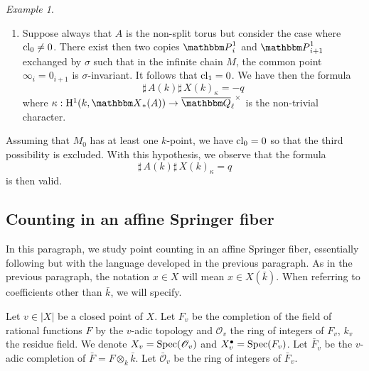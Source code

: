 \documentclass[12pt,english]{smfart}
\numberwithin{equation}{subsection}
\theoremstyle{remark}
\newtheorem{exemple}[equation]{Example}
\newcommand\calO{{\mathscr O}}
\newcommand\QQ{{\mathbbm Q}}
\newcommand\bbP{{\mathbbm P}}
\newcommand\rmH{{\rm H}}
\newcommand\bbX{{\mathbbm X}}
\newcommand\Spec{{\rm Spec}}
\newcommand\cl{{\rm cl}}
\newcommand\Ql{{\overline\QQ_\ell}}
\begin{document}
\begin{exemple}
\begin{enumerate}
   Suppose now that $\cl_0=0$. Then, there exists exactly
   one copy $\bbP^1_i$ in the infinite chain stable under $\sigma$.
   Since $A$ is the non-split torus, $\sigma$ necessarily exchanges
   $0_i$ and $\infty_i$. It follows that $\cl_1\not=0$.

   If $\kappa:\rmH^1(k,\bbX_*(A))\rightarrow \Ql^\times$ is the
   non-trivial character, we then have the formula
   $${\sharp\,} X(k)_\kappa=1-\frac{1}{q+1}=\frac{q}{q+1}
   $$
   which is more agreeable to remember in the form
   $${\sharp\,} A(k) {\sharp\,} X(k)_\kappa=q.$$

 \item Suppose always that $A$ is the non-split torus but
   consider the case where $\cl_0\not =0$. There exist then two copies
   $\bbP^1_i$ and $\bbP^1_{i+1}$ exchanged by $\sigma$ such that
   in the infinite chain $M$, the common point $\infty_i=
   0_{i+1}$ is $\sigma$-invariant. It follows that $\cl_1=0$. We have
   then the formula
   $${\sharp\,} A(k) {\sharp\,} X(k)_\kappa=-q$$
   where $\kappa:\rmH^1(k,\bbX_*(A))\rightarrow \Ql^\times$ is the
   non-trivial character.
\end{enumerate}

Assuming that $M_0$ has at least one $k$-point, we have $\cl_0=0$ so that the
third possibility is excluded. With this hypothesis, we observe
that the formula
$${\sharp\,} A(k) {\sharp\,} X(k)_\kappa=q$$
is then valid.

\end{exemple}

\subsection{Counting in an affine Springer fiber}\label{subsection : comptage Springer}

In this paragraph, we study point counting in an affine
Springer fiber, essentially following \cite[\S 15]{GKM} but with the
language developed in the previous paragraph. As in the
previous paragraph, the notation $x\in X$ will mean $x\in X(\bar k)$.
When referring to coefficients other than $\bar k$, we will specify.

Let $v\in |X|$ be a closed point of $X$. Let $F_v$ be the completion of the
field of rational functions $F$ by the $v$-adic topology and
$\calO_v$ the ring of integers of $F_v$, $k_v$ the residue field. We denote
$X_v=\Spec(\calO_v)$ and $X_v^\bullet=\Spec(F_v)$. Let $\bar F_v$ be the
$v$-adic completion of $\bar F=F\otimes_k\bar k$. Let $\bar\calO_v$
be the ring of integers of $\bar F_v$.
\end{document}
